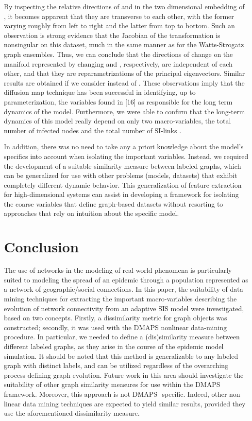 By inspecting the relative directions of and in the two dimensional
embedding of , it becomes apparent that they are transverse to each
other, with the former varying roughly from left to right and the
latter from top to bottom. Such an observation is strong evidence that
the Jacobian of the transformation is nonsingular on this dataset,
much in the same manner as for the Watts-Strogatz graph
ensembles. Thus, we can conclude that the directions of change on the
manifold represented by changing and , respectively, are independent
of each other, and that they are reparametrizations of the principal
eigenvectors. Similar results are obtained if we consider instead of
. These observations imply that the diffusion map technique has been
successful in identifying, up to parameterization, the variables found
in [16] as responsible for the long term dynamics of the
model. Furthermore, we were able to confirm that the long-term
dynamics of this model really depend on only two macro-variables, the
total number of infected nodes and the total number of SI-links .

In addition, there was no need to take any a priori knowledge about
the model's specifics into account when isolating the important
variables. Instead, we required the development of a suitable
similarity measure between labeled graphs, which can be generalized
for use with other problems (models, datasets) that exhibit completely
different dynamic behavior. This generalization of feature extraction
for high-dimensional systems can assist in developing a framework for
isolating the coarse variables that define graph-based datasets
without resorting to approaches that rely on intuition about the
specific model.

\section{Conclusion}

The use of networks in the modeling of real-world phenomena is
particularly suited to modeling the spread of an epidemic through a
population represented as a network of geographic/social
connections. In this paper, the suitability of data mining techniques
for extracting the important macro-variables describing the evolution
of network connectivity from an adaptive SIS model were investigated,
based on two concepts. Firstly, a dissimilarity metric for graph
objects was constructed; secondly, it was used with the DMAPS
nonlinear data-mining procedure. In particular, we needed to define a
(dis)similarity measure between different labeled graphs, as they
arise in the course of the epidemic model simulation. It should be
noted that this method is generalizable to any labeled graph with
distinct labels, and can be utilized regardless of the overarching
process defining graph evolution. Future work in this area should
investigate the suitability of other graph similarity measures for use
within the DMAPS framework. Moreover, this approach is not DMAPS-
specific. Indeed, other non-linear data mining techniques are expected
to yield similar results, provided they use the aforementioned
dissimilarity measure.

